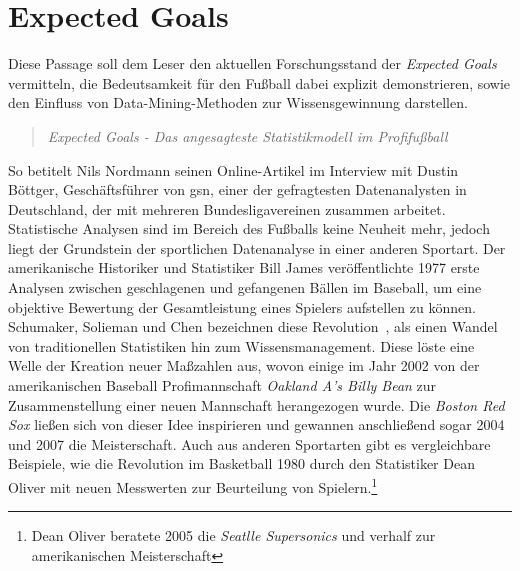 \section{Expected Goals}
Diese Passage soll dem Leser den aktuellen Forschungsstand der \textit{Expected Goals} vermitteln, die Bedeutsamkeit für den Fußball dabei explizit demonstrieren, sowie den Einfluss von Data-Mining-Methoden zur Wissensgewinnung darstellen.

\begin{quote}
\textit{\glqq Expected Goals - Das angesagteste Statistikmodell im Profifußball\grqq}
\end{quote}

So betitelt Nils Nordmann seinen Online-Artikel im Interview mit Dustin Böttger, Geschäftsführer von \gls{gsn}, einer der gefragtesten Datenanalysten in Deutschland, der mit mehreren Bundesligavereinen zusammen arbeitet. Statistische Analysen sind im Bereich des Fußballs keine Neuheit mehr, jedoch liegt der Grundstein der sportlichen Datenanalyse in einer anderen Sportart. Der amerikanische Historiker und Statistiker Bill James veröffentlichte 1977 erste Analysen zwischen geschlagenen und gefangenen Bällen im Baseball, um eine objektive Bewertung der Gesamtleistung eines Spielers aufstellen zu können. Schumaker, Solieman und Chen bezeichnen diese \glqq Revolution\grqq~, als einen Wandel von traditionellen Statistiken hin zum Wissensmanagement. Diese löste eine Welle der Kreation neuer Maßzahlen aus, wovon einige im Jahr 2002 von der amerikanischen Baseball Profimannschaft \textit{Oakland A’s Billy Bean} zur Zusammenstellung einer neuen Mannschaft herangezogen wurde. Die \textit{Boston Red Sox} ließen sich von dieser Idee inspirieren und  gewannen anschließend sogar 2004 und 2007 die Meisterschaft. Auch aus anderen Sportarten gibt es vergleichbare Beispiele, wie die Revolution im Basketball 1980 durch den Statistiker Dean Oliver mit neuen Messwerten zur Beurteilung von Spielern.\footnote{Dean Oliver beratete 2005 die \textit{Seatlle Supersonics} und verhalf zur amerikanischen Meisterschaft}

